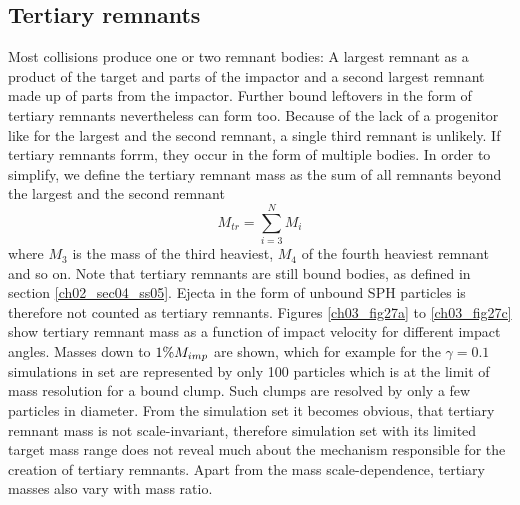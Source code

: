 \subsection{Tertiary remnants}
Most collisions produce one or two remnant bodies: A largest remnant as a product of the target and parts of the impactor and a second largest remnant made up of parts from the impactor. Further bound leftovers in the form of tertiary remnants nevertheless can form too. Because of the lack of a progenitor like for the largest and the second remnant, a single third remnant is unlikely. If tertiary remnants forrm, they occur in the form of multiple bodies. In order to simplify, we define the tertiary remnant mass as the sum of all remnants beyond the largest and the second remnant
\begin{equation}
M_{tr} = \sum_{i = 3}^N M_i
\end{equation}
where $M_3$ is the mass of the third heaviest, $M_4$ of the fourth heaviest remnant and so on. Note that tertiary remnants are still bound bodies, as defined in section \ref{ch02_sec04_ss05}. Ejecta in the form of unbound SPH particles is therefore not counted as tertiary remnants. Figures \ref{ch03_fig27a} to \ref{ch03_fig27c} show tertiary remnant mass as a function of impact velocity for different impact angles. Masses down to $1 \% M_{imp}$ are shown, which for example for the $\gamma = 0.1$ simulations in set \css are represented by only 100 particles which is at the limit of mass resolution for a bound clump. Such clumps are resolved by only a few particles in diameter. From the \css simulation set it becomes obvious, that tertiary remnant mass is not scale-invariant, therefore simulation set \rss with its limited target mass range does not reveal much about the mechanism responsible for the creation of tertiary remnants. Apart from the mass scale-dependence, tertiary masses also vary with mass ratio. 

